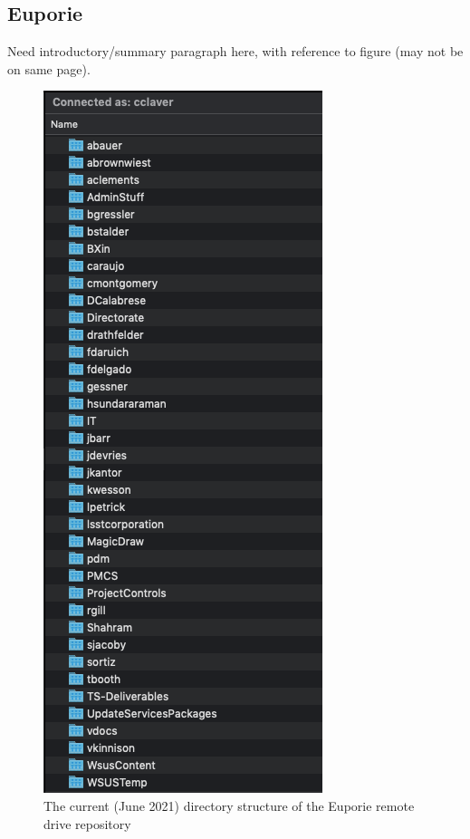 \subsection{Euporie}

Need introductory/summary paragraph here, with reference to figure (may not be on same page).

\begin{figure}
\begin{center}
  \includegraphics[scale=0.5]{Figures/EuporieDirectory.png}
\end{center}
\caption{\label{fig:EuporyDirectory} The current (June 2021) directory structure of the Euporie remote drive repository}
\end{figure}


